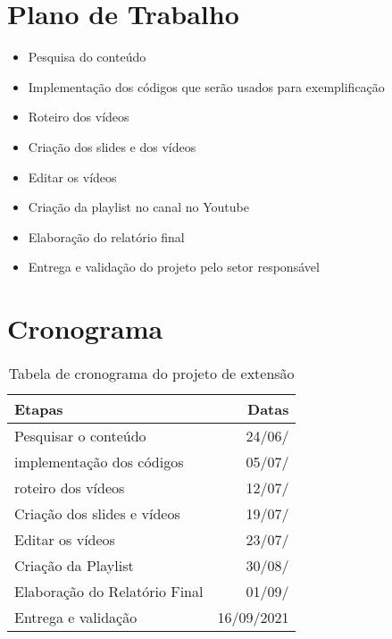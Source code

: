 \documentclass[a4paper,10pt]{article} %
\begin{document}
\section{Plano de Trabalho}

 \begin{itemize}
  \item Pesquisa do conteúdo 
  \item Implementação dos códigos que serão usados para exemplificação
  \item Roteiro dos vídeos
  \item Criação dos slides e dos vídeos
  \item Editar os vídeos
  \item Criação da playlist no canal no Youtube
  \item Elaboração do relatório final
  \item Entrega e validação do projeto pelo setor responsável
\end{itemize}

\section{Cronograma}

\begin{table}
\begin{center}
 \caption{Tabela de cronograma do projeto de extensão}
\begin{tabular}{|l|r|}
  \hline \hline
  \textbf{Etapas} & \textbf{Datas} \\ \hline \hline
   Pesquisar o conteúdo & 24/06/ \\ \hline
   implementação dos códigos & 05/07/ \\ \hline
   roteiro dos vídeos & 12/07/ \\ \hline
   Criação dos slides e vídeos  & 19/07/ \\ \hline
   Editar os vídeos  & 23/07/ \\ \hline
   Criação da Playlist  & 30/08/ \\ \hline
   Elaboração do Relatório Final  & 01/09/ \\ \hline
   Entrega e validação & 16/09/2021 \\ \hline \hline
\end{tabular} 
\label{tab:resultados}
\end{center}
\end{table}
\end{document}
